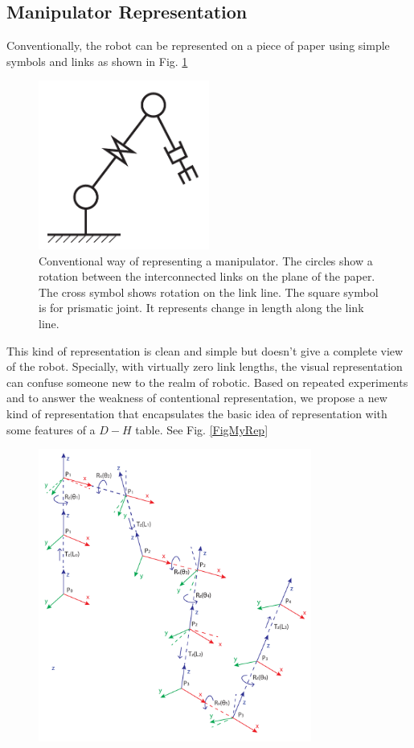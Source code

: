 {    \subsection{Manipulator Representation}
    {
        Conventionally, the robot can be represented on a piece of paper using simple symbols and links as shown in Fig. \ref{FigConventionalRep}
        \begin{figure}[hb]
          \centering
          \includegraphics[width=0.5\textwidth]{../Images/RobotRep1.pdf}
          \caption{Conventional way of representing a manipulator. The circles show a rotation between the interconnected links on the plane of the paper. The cross symbol shows rotation on the link line. The square symbol is for prismatic joint. It represents change in length along the link line.}\label{FigConventionalRep}
        \end{figure}
        This kind of representation is clean and simple but doesn't give a complete view of the robot. Specially, with virtually zero link lengths, the visual representation can confuse someone new to the realm of robotic. Based on repeated experiments and to answer the weakness of contentional representation, we propose a new kind of representation that encapsulates the basic idea of representation with some features of a $D-H$ table. See Fig. \ref{FigMyRep}
        \begin{figure}
          \centering
          \includegraphics[width=0.8\textwidth]{../Images/MyRep.pdf}

\end{figure}}}

